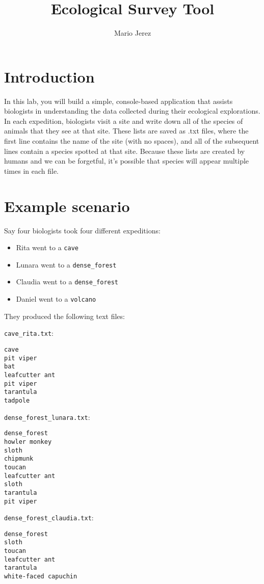 \documentclass[12pt,letterpaper]{article}
\title{Ecological Survey Tool}
\date{}
\author{Mario Jerez}
\begin{document}
\maketitle

\section{Introduction}

In this lab, you will build a simple, console-based application that assists biologists in understanding the data collected during their ecological explorations. In each expedition, biologists visit a site and write down all of the species of animals that they see at that site. These lists are saved as .txt files, where the first line contains the name of the site (with no spaces), and all of the subsequent lines contain a species spotted at that site. Because these lists are created by humans and we can be forgetful, it's possible that species will appear multiple times in each file.


\section{Example scenario}

Say four biologists took four different expeditions:
\begin{itemize}
    \item Rita went to a \texttt{cave}
    \item Lunara went to a \texttt{dense\_forest}
    \item Claudia went to a \texttt{dense\_forest}
    \item Daniel went to a \texttt{volcano}
\end{itemize}
\vspace{2mm}
They produced the following text files:

\vspace{2mm}
\texttt{cave\_rita.txt}:
\begin{lstlisting}
cave
pit viper
bat
leafcutter ant
pit viper
tarantula
tadpole
\end{lstlisting}


\vspace{2mm}
\texttt{dense\_forest\_lunara.txt}:
\begin{lstlisting}
dense_forest
howler monkey
sloth
chipmunk
toucan
leafcutter ant
sloth
tarantula
pit viper
\end{lstlisting}

\vspace{2mm}
\texttt{dense\_forest\_claudia.txt}:
\begin{lstlisting}
dense_forest
sloth
toucan
leafcutter ant
tarantula
white-faced capuchin
\end{lstlisting}
\end{document}
